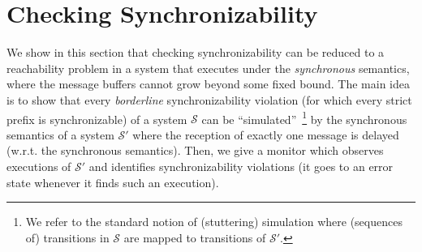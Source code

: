 \section{Checking Synchronizability}

We show in this section that checking synchronizability can be reduced 
to a reachability problem in a system that executes under the \emph{synchronous} semantics, 
where the message buffers cannot grow beyond some fixed bound. The main idea is to show that every
\emph{borderline} synchronizability violation (for which every strict prefix is synchronizable) of a system $\mathcal{S}$ can be ``simulated''~\footnote{We refer to the standard notion of (stuttering) simulation where (sequences of) transitions in $\mathcal{S}$ are mapped to transitions of $\mathcal{S'}$.}
by the synchronous semantics of a system $\mathcal{S'}$ where the reception of exactly one message is delayed (w.r.t. the synchronous semantics).
Then, we give a monitor which observes executions of $\mathcal{S'}$ and identifies synchronizability violations
(it goes to an error state whenever it finds such an execution).


